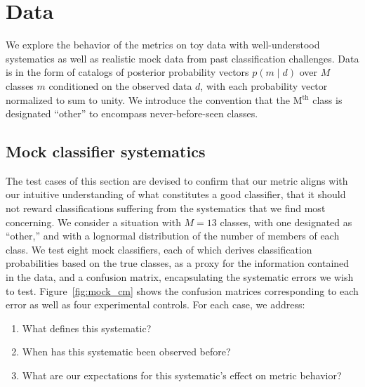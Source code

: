 \section{Data}
\label{sec:data}

We explore the behavior of the metrics on toy data with well-understood systematics as well as realistic mock data from past classification challenges.
Data is in the form of catalogs of posterior probability vectors $p(m \mid d)$ over $M$ classes $m$ conditioned on the observed data $d$, with each probability vector normalized to sum to unity.
We introduce the convention that the M$^{\mathrm{th}}$ class is designated ``other'' to encompass never-before-seen classes.

\subsection{Mock classifier systematics}
\label{sec:mockdata}

The test cases of this section are devised to confirm that our metric aligns with our intuitive understanding of what constitutes a good classifier, that it should not reward classifications suffering from the systematics that we find most concerning.
We consider a situation with $M=13$ classes, with one designated as ``other,'' and with a lognormal distribution of the number of members of each class.
We test eight mock classifiers, each of which derives classification probabilities based on the true classes, as a proxy for the information contained in the data, and a confusion matrix, encapsulating the systematic errors we wish to test.
Figure~\ref{fig:mock_cm} shows the confusion matrices corresponding to each error as well as four experimental controls.
For each case, we address:
\begin{enumerate}
  \item What defines this systematic?
  \item When has this systematic been observed before?
  \item What are our expectations for this systematic's effect on metric behavior?
\end{enumerate}

